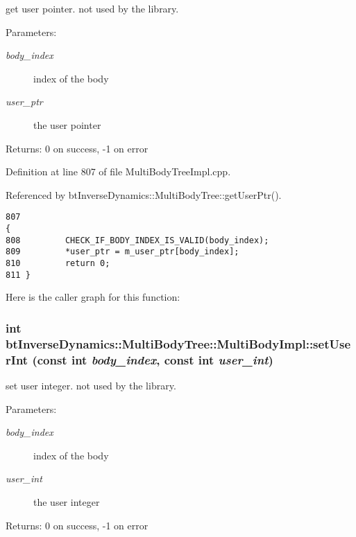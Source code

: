 get user pointer. not used by the library. \begin{Desc}
\item[Parameters:]
\begin{description}
\item[{\em body\_\-index}]index of the body \item[{\em user\_\-ptr}]the user pointer \end{description}
\end{Desc}
\begin{Desc}
\item[Returns:]0 on success, -1 on error \end{Desc}
 

Definition at line 807 of file MultiBodyTreeImpl.cpp.

Referenced by btInverseDynamics::MultiBodyTree::getUserPtr().

\begin{Code}\begin{verbatim}807                                                                                       {
808         CHECK_IF_BODY_INDEX_IS_VALID(body_index);
809         *user_ptr = m_user_ptr[body_index];
810         return 0;
811 }
\end{verbatim}
\end{Code}




Here is the caller graph for this function:\hypertarget{classbt_inverse_dynamics_1_1_multi_body_tree_1_1_multi_body_impl_975f98e25ccfc364e3e5b6f49bdce2f2}{
\subsubsection[setUserInt]{\setlength{\rightskip}{0pt plus 5cm}int btInverseDynamics::MultiBodyTree::MultiBodyImpl::setUserInt (const int {\em body\_\-index}, \/  const int {\em user\_\-int})}}
\label{classbt_inverse_dynamics_1_1_multi_body_tree_1_1_multi_body_impl_975f98e25ccfc364e3e5b6f49bdce2f2}


set user integer. not used by the library. \begin{Desc}
\item[Parameters:]
\begin{description}
\item[{\em body\_\-index}]index of the body \item[{\em user\_\-int}]the user integer \end{description}
\end{Desc}
\begin{Desc}
\item[Returns:]0 on success, -1 on error \end{Desc}
 

